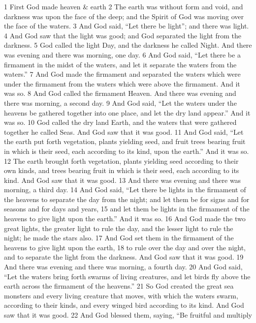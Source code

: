 1 First God made heaven \& earth 2 The earth was without form
and void, and darkness was upon the face of the deep; and the
Spirit of God was moving over the face of the waters. 3 And God
said, ``Let there be light''; and there was light. 4 And God saw that
the light was good; and God separated the light from the darkness.
5 God called the light Day, and the darkness he called Night. And
there was evening and there was morning, one day. 6 And God said,
``Let there be a firmament in the midst of the waters, and let it
separate the waters from the waters.'' 7 And God made the firmament
and separated the waters which were under the firmament from the
waters which were above the firmament. And it was so. 8 And God
called the firmament Heaven. And there was evening and there was
morning, a second day. 9 And God said, ``Let the waters under the
heavens be gathered together into one place, and let the dry land
appear.'' And it was so. 10 God called the dry land Earth, and the
waters that were gathered together he called Seas. And God saw that
it was good. 11 And God said, ``Let the earth put forth vegetation,
plants yielding seed, and fruit trees bearing fruit in which is
their seed, each according to its kind, upon the earth.'' And it was
so. 12 The earth brought forth vegetation, plants yielding seed
according to their own kinds, and trees bearing fruit in which is
their seed, each according to its kind. And God saw that it was
good. 13 And there was evening and there was morning, a third day.
14 And God said, ``Let there be lights in the firmament of the
heavens to separate the day from the night; and let them be for
signs and for seasons and for days and years, 15 and let them be
lights in the firmament of the heavens to give light upon the
earth.'' And it was so. 16 And God made the two great lights, the
greater light to rule the day, and the lesser light to rule the
night; he made the stars also. 17 And God set them in the firmament
of the heavens to give light upon the earth, 18 to rule over the
day and over the night, and to separate the light from the
darkness. And God saw that it was good. 19 And there was evening
and there was morning, a fourth day. 20 And God said, ``Let the
waters bring forth swarms of living creatures, and let birds fly
above the earth across the firmament of the heavens.'' 21 So God
created the great sea monsters and every living creature that
moves, with which the waters swarm, according to their kinds, and
every winged bird according to its kind. And God saw that it was
good. 22 And God blessed them, saying, ``Be fruitful and multiply
